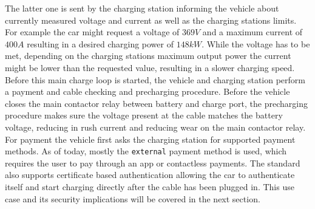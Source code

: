 \documentclass[conference,flushend]{iaria} %
\begin{document}
The latter one is sent by the charging station informing the vehicle about currently measured voltage and current as well as the charging stations limits.
For example the car might request a voltage of $369V$ and a maximum current of $400A$ resulting in a desired charging power of $148kW$.
While the voltage has to be met, depending on the charging stations maximum output power the current might be lower than the requested value, resulting in a slower charging speed. \\
Before this main charge loop is started, the vehicle and charging station perform a payment and cable checking and precharging procedure.
Before the vehicle closes the main contactor relay between battery and charge port, the precharging procedure makes sure the voltage present at the cable matches the battery voltage, reducing in rush current and reducing wear on the main contactor relay.
For payment the vehicle first asks the charging station for supported payment methods.
As of today, mostly the \verb'external' payment method is used, which requires the user to pay through an app or contactless payments.
The standard also supports certificate based authentication allowing the car to authenticate itself and start charging directly after the cable has been plugged in.
This use case and its security implications will be covered in the next section.
\end{document}
